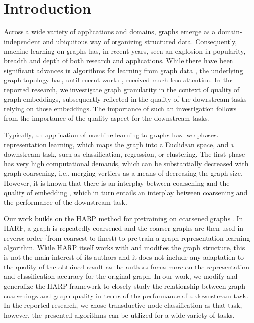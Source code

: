 \documentclass[sn-mathphys,pdflatex,iicol]{sn-jnl}%
\begin{document}
\section{Introduction}
Across a wide variety of applications and domains, graphs emerge as a domain-independent and ubiquitous way of organizing structured data. Consequently, machine learning on graphs has, in recent years, seen an explosion in popularity, breadth and depth of both research and applications. While there have been significant advances in algorithms for learning from graph data \cite{defferrard_convolutional_2016, kipf_semi-supervised_2017}, the underlying graph topology has, until recent works \cite{topping_understanding_2021, velickovic_geometric_2021}, received much less attention. In the reported research, we investigate graph granularity in the context of quality of graph embeddings, subsequently reflected in the quality of the downstream tasks relying on those embeddings. The importance of such an investigation follows from the importance of the quality aspect for the downstream tasks.

Typically, an application of machine learning to graphs has two phases: representation learning, which maps the graph into a Euclidean space, and a downstream task, such as classification, regression, or clustering. The first phase has very high computational demands, which can be substantially decreased with graph coarsening, i.e., merging vertices as a means of decreasing the graph size. However, it is known that there is an interplay between coarsening and the quality of embedding \cite{akyildiz_understanding_2020, makarov_survey_2021}, which in turn entails an interplay between coarsening and the performance of the downstream task.

Our work builds on the HARP method for pretraining on coarsened graphs \cite{chen_harp_2018}. In HARP, a graph is repeatedly coarsened and the coarser graphs are then used in reverse order (from coarsest to finest) to pre-train a graph representation learning algorithm. While HARP itself works with and modifies the graph structure, this is not the main interest of its authors and it does not include any adaptation to the quality of the obtained result as the authors focus more on the representation and classification accuracy for the original graph. In our work, we modify and generalize the HARP framework to closely study the relationship between graph coarsenings and graph quality in terms of the performance of a downstream task. In the reported research, we chose transductive node classification as that task, however, the presented algorithms can be utilized for a wide variety of tasks.
\end{document}
